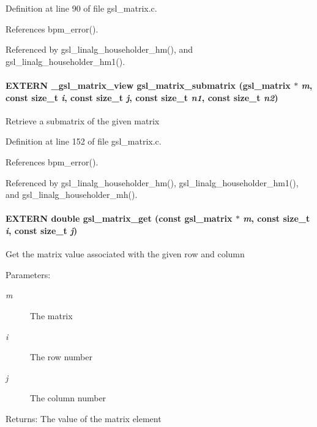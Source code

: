 Definition at line 90 of file gsl\_\-matrix.c.

References bpm\_\-error().

Referenced by gsl\_\-linalg\_\-householder\_\-hm(), and gsl\_\-linalg\_\-householder\_\-hm1().
\paragraph[gsl\_\-matrix\_\-submatrix]{\setlength{\rightskip}{0pt plus 5cm}EXTERN \_\-gsl\_\-matrix\_\-view gsl\_\-matrix\_\-submatrix (gsl\_\-matrix $\ast$ {\em m}, \/  const size\_\-t {\em i}, \/  const size\_\-t {\em j}, \/  const size\_\-t {\em n1}, \/  const size\_\-t {\em n2})}\hfill\label{group__nr_gfdc58523ac0360ed26d46caf0cb8a1a9}


Retrieve a submatrix of the given matrix 

Definition at line 152 of file gsl\_\-matrix.c.

References bpm\_\-error().

Referenced by gsl\_\-linalg\_\-householder\_\-hm(), gsl\_\-linalg\_\-householder\_\-hm1(), and gsl\_\-linalg\_\-householder\_\-mh().
\paragraph[gsl\_\-matrix\_\-get]{\setlength{\rightskip}{0pt plus 5cm}EXTERN double gsl\_\-matrix\_\-get (const gsl\_\-matrix $\ast$ {\em m}, \/  const size\_\-t {\em i}, \/  const size\_\-t {\em j})}\hfill\label{group__nr_g9fae5772557e8c1c08fb200da79b8bd4}


Get the matrix value associated with the given row and column

\begin{Desc}
\item[Parameters:]
\begin{description}
\item[{\em m}]The matrix \item[{\em i}]The row number \item[{\em j}]The column number\end{description}
\end{Desc}
\begin{Desc}
\item[Returns:]The value of the matrix element \end{Desc}


